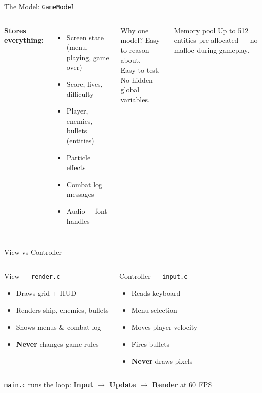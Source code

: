 \documentclass[aspectratio=169,10pt]{beamer}
\begin{document}
\begin{frame}{The Model: \texttt{GameModel}}
  \begin{columns}[T]
    \textbf{Stores everything:}
    \begin{itemize}
      \item Screen state (menu, playing, game over)
      \item Score, lives, difficulty
      \item Player, enemies, bullets (entities)
      \item Particle effects
      \item Combat log messages
      \item Audio + font handles
    \end{itemize}
    \begin{block}{Why one model?}
      Easy to reason about.\\
      Easy to test.\\
      No hidden global variables.
    \end{block}
    \begin{exampleblock}{Memory pool}
      Up to 512 entities pre-allocated --- no malloc during gameplay.
    \end{exampleblock}
  \end{columns}
\end{frame}

\begin{frame}{View vs Controller}
  \begin{columns}[T]
    \begin{block}{View --- \texttt{render.c}}
      \begin{itemize}
        \item Draws grid + HUD
        \item Renders ship, enemies, bullets
        \item Shows menus \& combat log
        \item \textbf{Never} changes game rules
      \end{itemize}
    \end{block}
    \begin{block}{Controller --- \texttt{input.c}}
      \begin{itemize}
        \item Reads keyboard
        \item Menu selection
        \item Moves player velocity
        \item Fires bullets
        \item \textbf{Never} draws pixels
      \end{itemize}
    \end{block}
  \end{columns}
  \vspace{0.3cm}
  \centering
  \small \texttt{main.c} runs the loop: \textbf{Input $\rightarrow$ Update $\rightarrow$ Render} at 60 FPS
\end{frame}
\end{document}
